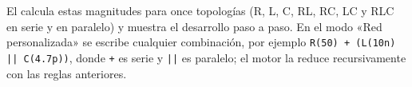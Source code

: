 \begin{enlaapp}
El  calcula estas magnitudes para once topologías (R, L, C, RL, RC, LC y RLC en serie y en paralelo) y
muestra el desarrollo paso a paso. En el modo «Red personalizada» se escribe cualquier combinación, por ejemplo
\texttt{R(50) + (L(10n) || C(4.7p))}, donde \texttt{+} es serie y \texttt{||} es paralelo; el motor la reduce recursivamente con las reglas anteriores.
\end{enlaapp}

